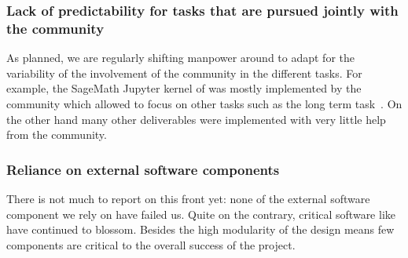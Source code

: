 \subsubsection{Lack of predictability for tasks that are pursued jointly
  with the community}

As planned, we are regularly shifting manpower around to adapt for the
variability of the involvement of the community in the different
tasks. For example, the SageMath Jupyter kernel of
 was mostly implemented by the
community which allowed to focus on other tasks such as the long term
task~.  On
the other hand many other deliverables were implemented with very
little help from the community.

\subsubsection{Reliance on external software components}

There is not much to report on this front yet: none of the external
software component we rely on have failed us. Quite on the contrary,
critical software like \Jupyter have continued to blossom. Besides the
high modularity of the design means few components are critical to the
overall success of the project.


